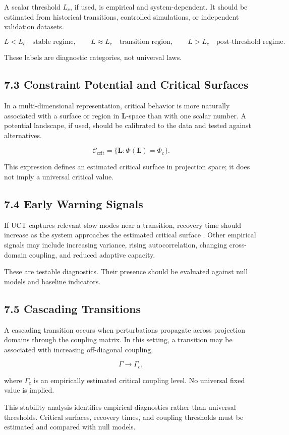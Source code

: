 A scalar threshold \(L_c\), if used, is empirical and system-dependent. It should be estimated from historical transitions, controlled simulations, or independent validation datasets.

\[ L<L_c \quad \text{stable regime}, \qquad L\approx L_c \quad \text{transition region}, \qquad L>L_c \quad \text{post-threshold regime}. \]

These labels are diagnostic categories, not universal laws.

\subsection{7.3 Constraint Potential and Critical Surfaces}

In a multi-dimensional representation, critical behavior is more naturally associated with a surface or region in \(\mathbf{L}\)-space than with one scalar number. A potential landscape, if used, should be calibrated to the data and tested against alternatives.

\[ \mathcal{C}_{\mathrm{crit}}=\{\mathbf{L}: \Phi(\mathbf{L})=\Phi_c\}. \]

This expression defines an estimated critical surface in projection space; it does not imply a universal critical value.

\subsection{7.4 Early Warning Signals}

If UCT captures relevant slow modes near a transition, recovery time should increase as the system approaches the estimated critical surface \cite{Scheffer2009EarlyWarning,Dakos2008Slowing}. Other empirical signals may include increasing variance, rising autocorrelation, changing cross-domain coupling, and reduced adaptive capacity.

These are testable diagnostics. Their presence should be evaluated against null models and baseline indicators.

\subsection{7.5 Cascading Transitions}

A cascading transition occurs when perturbations propagate across projection domains through the coupling matrix. In this setting, a transition may be associated with increasing off-diagonal coupling,

\[ \Gamma\rightarrow\Gamma_c, \]

where \(\Gamma_c\) is an empirically estimated critical coupling level. No universal fixed value is implied.

This stability analysis identifies empirical diagnostics rather than universal thresholds. Critical surfaces, recovery times, and coupling thresholds must be estimated and compared with null models.


